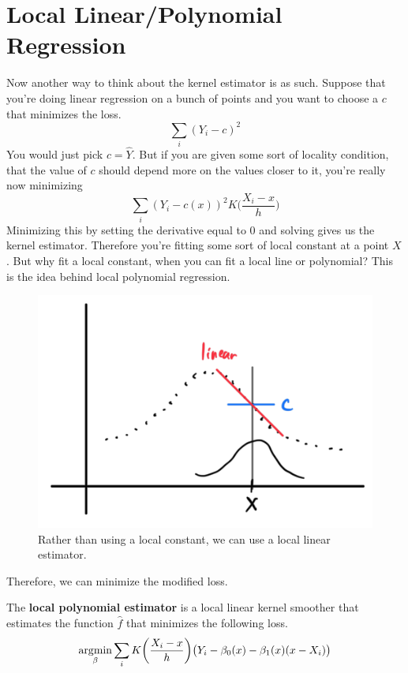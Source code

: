 \section{Local Linear/Polynomial Regression}

  Now another way to think about the kernel estimator is as such. Suppose that you're doing linear regression on a bunch of points and you want to choose a $c$ that minimizes the loss. 
  \begin{equation}
    \sum_i (Y_i - c)^2
  \end{equation}
  You would just pick $c = \hat{Y}$. But if you are given some sort of locality condition, that the value of $c$ should depend more on the values closer to it, you're really now minimizing 
  \begin{equation}
    \sum_i (Y_i - c(x))^2 K \bigg( \frac{X_i - x}{h} \bigg)
  \end{equation}
  Minimizing this by setting the derivative equal to $0$ and solving gives us the kernel estimator. Therefore you're fitting some sort of local constant at a point $X$. But why fit a local constant, when you can fit a local line or polynomial? This is the idea behind local polynomial regression.

  \begin{figure}[H]
    \centering 
    \includegraphics[scale=0.4]{img/local_linear_estimator.png}
    \caption{Rather than using a local constant, we can use a local linear estimator.} 
    \label{fig:local_linear_estimator}
  \end{figure}

  Therefore, we can minimize the modified loss. 

  \begin{definition}
    The \textbf{local polynomial estimator} is a local linear kernel smoother that estimates the function $\hat{f}$ that minimizes the following loss. 
    \begin{equation}
      \argmin_{\beta} \sum_i K \bigg( \frac{X_i - x}{h} \bigg) \big( Y_i - \beta_0 (x) - \beta_1 (x) (x- X_i)\big)
    \end{equation}
  \end{definition}

